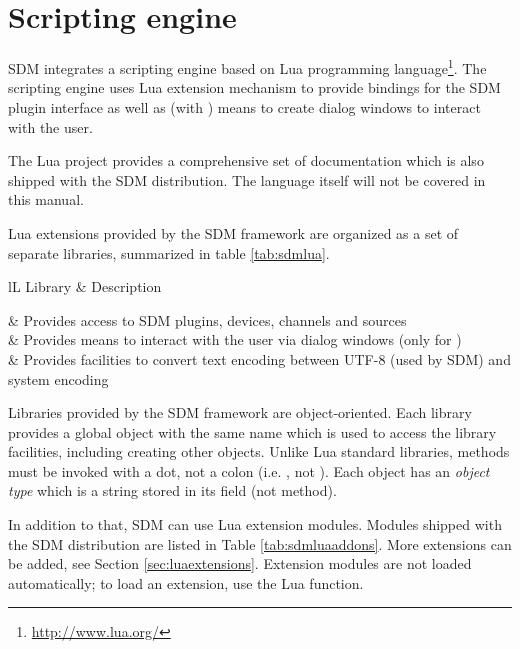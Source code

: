 \documentclass[a4paper,12pt,twoside,extrafontsizes]{memoir}
\begin{document}
\chapter{Scripting engine}
\label{ch:scripting}

SDM integrates a scripting engine based on Lua programming language\footnote{\url{http://www.lua.org/}}. The scripting engine uses Lua extension mechanism to provide bindings for the SDM plugin interface as well as (with ) means to create dialog windows to interact with the user.

The Lua project provides a comprehensive set of documentation which is also shipped with the SDM distribution. The language itself will not be covered in this manual.

Lua extensions provided by the SDM framework are organized as a set of separate libraries, summarized in table \ref{tab:sdmlua}.

\begin{table}[htbp]
	\caption{Core Lua extensions provided by SDM}
	\label{tab:sdmlua}
	\begin{tabularx}{\textwidth}{lL}
		\toprule
		Library & Description \\
		\midrule

		 & Provides access to SDM plugins, devices, channels and sources \\
		 & Provides means to interact with the user via dialog windows (only for ) \\
		 & Provides facilities to convert text encoding between UTF-8 (used by SDM) and system encoding \\
		
		\bottomrule
	\end{tabularx}
\end{table}

Libraries provided by the SDM framework are object-oriented. Each library provides a global object with the same name which is used to access the library facilities, including creating other objects. Unlike Lua standard libraries, methods must be invoked with a dot, not a colon (i.e. , not ). Each object has an \emph{object type} which is a string stored in its  field (not method).

In addition to that, SDM can use Lua extension modules. Modules shipped with the SDM distribution are listed in Table \ref{tab:sdmluaaddons}. More extensions can be added, see Section \ref{sec:luaextensions}. Extension modules are not loaded automatically; to load an extension, use the  Lua function.
\end{document}
